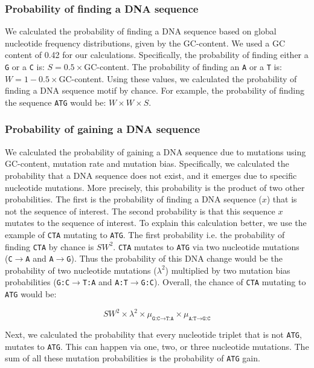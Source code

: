 \documentclass[12pt,a4paper]{article}
\begin{document}
\subsubsection{Probability of finding a DNA sequence}
\label{methprob}

We calculated the probability of finding a DNA sequence based on global nucleotide frequency distributions, given by the GC-content. We used a GC content of 0.42 for our calculations. Specifically, the probability of finding either a \texttt{G} or a \texttt{C} is: $S = 0.5\times$GC-content. The probability of finding an \texttt{A} or a \texttt{T} is: $W = 1 - 0.5\times$GC-content. Using these values, we calculated the probability of finding a DNA sequence motif by chance. For example, the probability of finding the sequence \texttt{ATG} would be: $W\times W \times S$.

\subsubsection{Probability of gaining a DNA sequence}
\label{methgain}

We calculated the probability of gaining a DNA sequence due to mutations using GC-content, mutation rate and mutation bias. Specifically, we calculated the probability that a DNA sequence does not exist, and it emerges due to specific nucleotide mutations. More precisely, this probability is the product of two other probabilities. The first is the probability of finding a DNA sequence ($x$) that is not the sequence of interest. The second probability is that this sequence $x$ mutates to the sequence of interest. To explain this calculation better, we use the example of \texttt{CTA} mutating to \texttt{ATG}. The first probability i.e. the probability of finding \texttt{CTA} by chance is $SW^2$. \texttt{CTA} mutates to \texttt{ATG} via two nucleotide mutations (\texttt{C}$\to$\texttt{A} and \texttt{A}$\to$\texttt{G}). Thus the probability of this DNA change would be the probability of two nucleotide mutations ($\lambda^2$) multiplied by two mutation bias probabilities (\texttt{G:C}$\to$\texttt{T:A} and \texttt{A:T}$\to$\texttt{G:C}). Overall, the chance of \texttt{CTA} mutating to \texttt{ATG} would be:

$$SW^2 \times \lambda^2 \times \mu_{\texttt{G:C}\to\texttt{T:A}} \times \mu_{\texttt{A:T}\to\texttt{G:C}}$$

Next, we calculated the probability that every nucleotide triplet that is not \texttt{ATG}, mutates to \texttt{ATG}. This can happen via one, two, or three nucleotide mutations. The sum of all these mutation probabilities is the probability of \texttt{ATG} gain.
\end{document}
